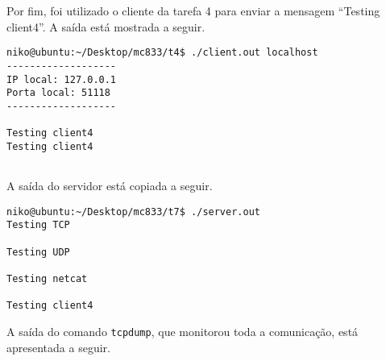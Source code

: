 \documentclass[a4paper,10pt]{article}
\begin{document}
Por fim, foi utilizado o cliente da tarefa 4 para enviar a mensagem ``Testing client4''. A saída está mostrada a seguir.

\begin{lstlisting}
niko@ubuntu:~/Desktop/mc833/t4$ ./client.out localhost
-------------------
IP local: 127.0.0.1
Porta local: 51118
-------------------

Testing client4
Testing client4


\end{lstlisting}

A saída do servidor está copiada a seguir.

\begin{lstlisting}
niko@ubuntu:~/Desktop/mc833/t7$ ./server.out 
Testing TCP

Testing UDP

Testing netcat

Testing client4

\end{lstlisting}

A saída do comando {\tt tcpdump}, que monitorou toda a comunicação, está apresentada a seguir.
\end{document}
